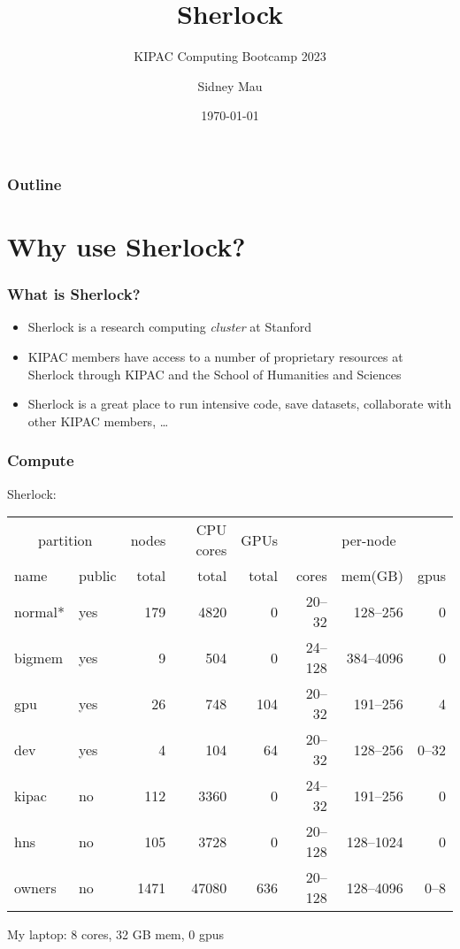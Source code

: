 \documentclass[aspectratio=169]{beamer}
\title{Sherlock}
\subtitle{KIPAC Computing Bootcamp 2023}
\author[S. Mau]{Sidney Mau}
\institute[Stanford]{Stanford University}
\date[\today]{\today}
\begin{document}

\frame{\titlepage}

\begin{frame}
	\frametitle{Outline}
	\tableofcontents
\end{frame}


\section{Why use Sherlock?}

\frame{\sectionpage}

\begin{frame}
	\frametitle{What is Sherlock?}
	\begin{itemize}
		\item Sherlock is a research computing \emph{cluster} at Stanford
		\item KIPAC members have access to a number of proprietary resources at Sherlock through KIPAC and the School of Humanities and Sciences
		\item Sherlock is a great place to run intensive code, save datasets, collaborate with other KIPAC members, \dots
	\end{itemize}
\end{frame}

\begin{frame}
	\frametitle{Compute}
	Sherlock:
	\begin{center}
		\begin{tabular}{|l|l||r|r|r||r|r|r|}
			\hline
			\multicolumn{2}{|c||}{partition} & nodes & CPU cores & GPUs & \multicolumn{3}{|c|}{per-node} \\
			 name      &  public & total &     total & total &  cores &  mem(GB) & gpus \\
			\hline
			 normal*   &  yes    &   179 &      4820 &     0 &  20--32 &  128--256 &    0 \\
			 bigmem    &  yes    &     9 &       504 &     0 & 24--128 & 384--4096 &    0 \\
			 gpu       &  yes    &    26 &       748 &   104 &  20--32 &  191--256 &    4 \\
			 dev       &  yes    &     4 &       104 &    64 &  20--32 &  128--256 & 0--32 \\
			\hline
			 kipac     &  no     &   112 &      3360 &     0 &  24--32 &  191--256 &    0 \\
			 hns       &  no     &   105 &      3728 &     0 & 20--128 & 128--1024 &    0 \\
			\hline
			 owners    &  no     &  1471 &     47080 &   636 & 20--128 & 128--4096 &  0--8 \\
			\hline
		\end{tabular}
	\end{center}
	My laptop: 8 cores, 32 GB mem, 0 gpus
\end{frame}
\end{document}
